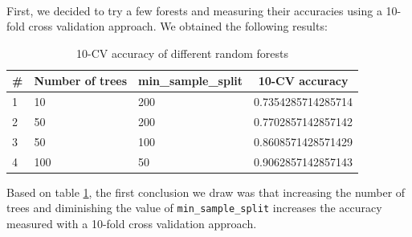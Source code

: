 \documentclass[a4paper, 11pt, oneside]{article}
\begin{document}
\paragraph{}First, we decided to try a few forests and measuring their accuracies using a 10-fold cross validation approach. We obtained the following results:
\begin{table}[H]
\centering
\begin{tabular}{|l|l|l|l|}
\hline
\multicolumn{1}{|c|}{\textbf{\#}} & \multicolumn{1}{c|}{\textbf{Number of trees}} & \multicolumn{1}{c|}{\textbf{min\_sample\_split}} & \multicolumn{1}{c|}{\textbf{10-CV accuracy}} \\ \hline
1 & 10 & 200 & 0.7354285714285714 \\ \hline
2 & 50 & 200 & 0.7702857142857142 \\ \hline
3 & 50 & 100 & 0.8608571428571429 \\ \hline
4 & 100 & 50 & 0.9062857142857143 \\ \hline
\end{tabular}
\caption{10-CV accuracy of different random forests}
\label{tab:rf-acc}
\end{table}
Based on table \ref{tab:rf-acc}, the first conclusion we draw was that increasing the number of trees and diminishing the value of \texttt{min\_sample\_split} increases the accuracy measured with a 10-fold cross validation approach.
\end{document}

